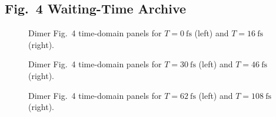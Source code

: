 \subsection{Fig.~4 Waiting-Time Archive}

\begin{figure}[p]
    \centering
    \begin{minipage}[t]{0.49\linewidth}
        \centering
        \safeplaceholdergraphic[0.98\linewidth]{\dimerFigFourWaitZeroPaperTimePath}
    \end{minipage}\hfill
    \begin{minipage}[t]{0.49\linewidth}
        \centering
        \safeplaceholdergraphic[0.98\linewidth]{\dimerFigFourWaitSixteenPaperTimePath}
    \end{minipage}
    \caption{Dimer Fig.~4 time-domain panels for $T=\SI{0}{\femto\second}$ (left) and $T=\SI{16}{\femto\second}$ (right).}
    \label{fig:app_dimer_fig4_time_t0_t16}
\end{figure}

\begin{figure}[p]
    \centering
    \begin{minipage}[t]{0.49\linewidth}
        \centering
        \safeplaceholdergraphic[0.98\linewidth]{\dimerFigFourWaitThirtyPaperTimePath}
    \end{minipage}\hfill
    \begin{minipage}[t]{0.49\linewidth}
        \centering
        \safeplaceholdergraphic[0.98\linewidth]{\dimerFigFourWaitFortySixPaperTimePath}
    \end{minipage}
    \caption{Dimer Fig.~4 time-domain panels for $T=\SI{30}{\femto\second}$ (left) and $T=\SI{46}{\femto\second}$ (right).}
    \label{fig:app_dimer_fig4_time_t30_t46}
\end{figure}

\begin{figure}[p]
    \centering
    \begin{minipage}[t]{0.49\linewidth}
        \centering
        \safeplaceholdergraphic[0.98\linewidth]{\dimerFigFourWaitSixtyTwoPaperTimePath}
    \end{minipage}\hfill
    \begin{minipage}[t]{0.49\linewidth}
        \centering
        \safeplaceholdergraphic[0.98\linewidth]{\dimerFigFourWaitOneOhEightPaperTimePath}
    \end{minipage}
    \caption{Dimer Fig.~4 time-domain panels for $T=\SI{62}{\femto\second}$ (left) and $T=\SI{108}{\femto\second}$ (right).}
    \label{fig:app_dimer_fig4_time_t62_t108}
\end{figure}

